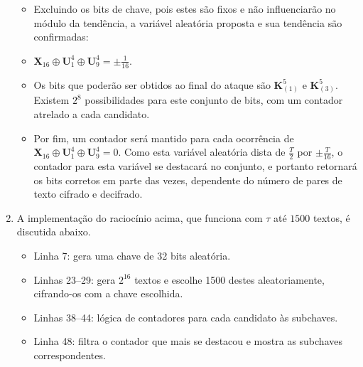 \documentclass{../sftex/sftex}
\begin{document}
\begin{enumerate}
    \begin{itemize}

        \item Excluindo os bits de chave, pois estes são fixos e não
            influenciarão no módulo da tendência, a variável aleatória
            proposta e sua tendência são confirmadas:

        \item $\textbf{X}_{16} \oplus \textbf{U}^{4}_{1} \oplus
            \textbf{U}^{4}_{9} = \pm \frac{1}{16}$.

        \item Os bits que poderão ser obtidos ao final do ataque são
            $\textbf{K}^{5}_{(1)}$ e $\textbf{K}^{5}_{(3)}$. Existem $2^{8}$
            possibilidades para este conjunto de bits, com um contador
            atrelado a cada candidato.

        \item Por fim, um contador será mantido para cada ocorrência de
            $\textbf{X}_{16} \oplus \textbf{U}^{4}_{1} \oplus
            \textbf{U}^{4}_{9} = 0$. Como esta variável aleatória dista de
            $\frac{T}{2}$ por $\pm\frac{T}{16}$, o contador para esta variável
            se destacará no conjunto, e portanto retornará os bits corretos em
            parte das vezes, dependente do número de pares de texto cifrado e
            decifrado.

    \end{itemize}

    \item A implementação do raciocínio acima, que funciona com $\tau$ até
        $1500$ textos, é discutida abaixo.

    \begin{itemize}

        

        \item Linha 7: gera uma chave de 32 bits aleatória.

        \item Linhas 23--29: gera $2^{16}$ textos e escolhe 1500 destes
            aleatoriamente, cifrando-os com a chave escolhida.

        \item Linhas 38--44: lógica de contadores para cada candidato às
            subchaves.

        \item Linha 48: filtra o contador que mais se destacou e mostra as
            subchaves correspondentes.

    \end{itemize}

\end{enumerate}
\end{document}
